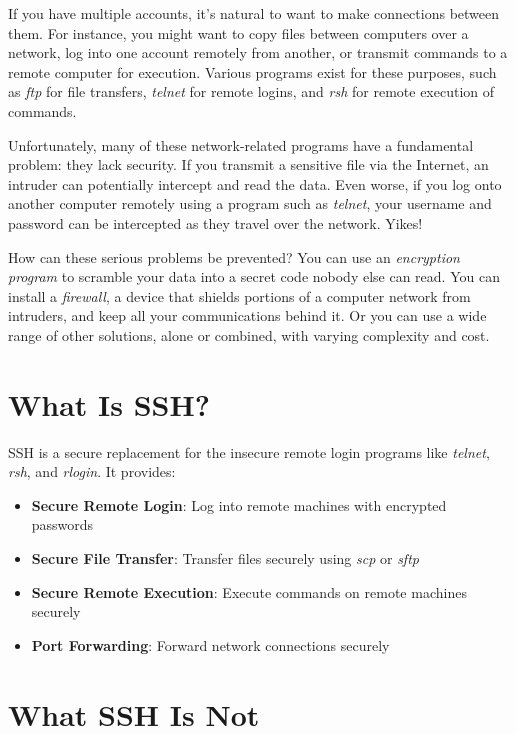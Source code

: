 \documentclass[12pt]{book}
\begin{document}
If you have multiple accounts, it's natural to want to make connections between them. For instance, you might want to copy files between computers over a network, log into one account remotely from another, or transmit commands to a remote computer for execution. Various programs exist for these purposes, such as \textit{ftp} for file transfers, \textit{telnet} for remote logins, and \textit{rsh} for remote execution of commands.

Unfortunately, many of these network-related programs have a fundamental problem: they lack security. If you transmit a sensitive file via the Internet, an intruder can potentially intercept and read the data. Even worse, if you log onto another computer remotely using a program such as \textit{telnet}, your username and password can be intercepted as they travel over the network. Yikes!

How can these serious problems be prevented? You can use an \textit{encryption program} to scramble your data into a secret code nobody else can read. You can install a \textit{firewall}, a device that shields portions of a computer network from intruders, and keep all your communications behind it. Or you can use a wide range of other solutions, alone or combined, with varying complexity and cost.

\section{What Is SSH?}

SSH is a secure replacement for the insecure remote login programs like \textit{telnet}, \textit{rsh}, and \textit{rlogin}. It provides:

\begin{itemize}
    \item \textbf{Secure Remote Login}: Log into remote machines with encrypted passwords
    \item \textbf{Secure File Transfer}: Transfer files securely using \textit{scp} or \textit{sftp}
    \item \textbf{Secure Remote Execution}: Execute commands on remote machines securely
    \item \textbf{Port Forwarding}: Forward network connections securely
\end{itemize}

\section{What SSH Is Not}
\end{document}
